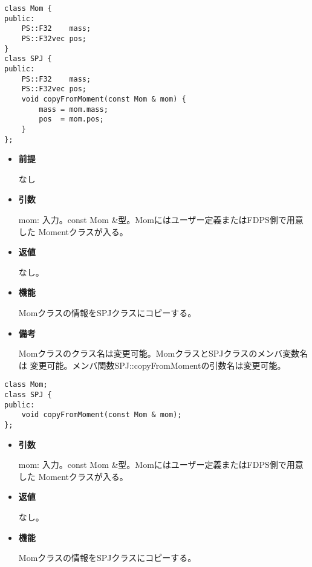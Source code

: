 
\begin{screen}
\begin{verbatim}
class Mom {
public:
    PS::F32    mass;
    PS::F32vec pos;
}
class SPJ {
public:
    PS::F32    mass;
    PS::F32vec pos;
    void copyFromMoment(const Mom & mom) {
        mass = mom.mass;
        pos  = mom.pos;
    }
};
\end{verbatim}
\end{screen}

\begin{itemize}

\item {\bf 前提}

  なし
  
\item {\bf 引数}

  mom: 入力。const Mom \&型。Momにはユーザー定義またはFDPS側で用意した
  Momentクラスが入る。

\item {\bf 返値}

  なし。
  
\item {\bf 機能}

  Momクラスの情報をSPJクラスにコピーする。

\item {\bf 備考}

  Momクラスのクラス名は変更可能。MomクラスとSPJクラスのメンバ変数名は
  変更可能。メンバ関数SPJ::copyFromMomentの引数名は変更可能。

\end{itemize}
\fi

\begin{screen}
\begin{verbatim}
class Mom;
class SPJ {
public:
    void copyFromMoment(const Mom & mom);
};
\end{verbatim}
\end{screen}

\begin{itemize}

\item {\bf 引数}

  mom: 入力。const Mom \&型。Momにはユーザー定義またはFDPS側で用意した
  Momentクラスが入る。

\item {\bf 返値}

  なし。
  
\item {\bf 機能}

  Momクラスの情報をSPJクラスにコピーする。

\end{itemize}

